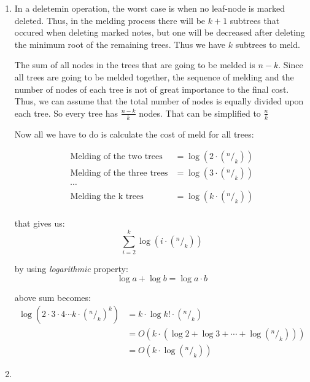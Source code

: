 \begin{enumerate}
  \item 
  In a deletemin operation, the worst case is when no leaf-node is marked deleted. Thus, in the melding process there will be $k+1$ subtrees that occured when deleting marked notes, but one will be decreased after deleting the minimum root of the remaining trees. Thus we have $k$ subtrees to meld.

  The sum of all nodes in the trees that are going to be melded is $n-k$. Since all trees are going to be melded together, the sequence of melding and the number of nodes of each tree is not of great importance to the final cost. Thus, we can assume that the total number of nodes is equally divided upon each tree. So every tree has $\frac{n - k}{k}$ nodes. That can be simplified to $\frac{n}{k}$

  Now all we have to do is calculate the cost of meld for all trees:
  
  \begin{align*}
    \text{Melding of the two trees}   &= \log(2 \cdot (^n/_k)) \\
    \text{Melding of the three trees} &= \log(3 \cdot (^n/_k)) \\
    \cdots  \\
    \text{Melding the k trees}        &= \log(k \cdot (^n/_k)) \\
  \end{align*}

 that gives us:
 $$
  \sum_{i=2}^{k}{\log(i \cdot (^n/_k))} 
 $$

 by using \textit{logarithmic} property: 
 $$
  \log a + \log b = \log a \cdot b 
 $$
 
 above sum becomes: 
 \begin{align*}
   \log(2 \cdot 3 \cdot 4 \cdots k \cdot (^n/_k)^{k}) &= k \cdot \log {k! \cdot (^n/_k)} \\
   &= O(k \cdot (\log 2 + \log 3 + \cdots + \log (^n/_k))) \\
   &= O(k \cdot \log(^n/_k))
 \end{align*}

 \item

\end{enumerate}